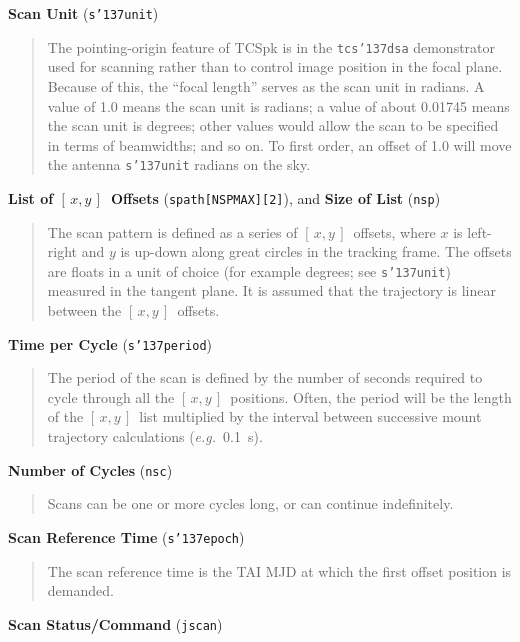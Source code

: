\documentclass[12pt,fleqn,twoside]{article}
\renewcommand{\_}{{\tt\char'137}}     %
\newcommand{\xy}        {$[\,x,y\,]$}
\begin{document}
{\bf Scan Unit} ({\tt s\_unit})
\begin{quote}
     The pointing-origin feature of TCSpk is in the
     {\tt tcs\_dsa} demonstrator used for scanning rather than
     to control image position in the focal plane.  Because of
     this, the ``focal length'' serves as the scan unit in radians.
     A value of 1.0 means the scan unit is
     radians;  a value of about 0.01745 means the scan unit is
     degrees;  other values would allow the scan to be specified
     in terms of beamwidths; and so on.  To first order, an offset
     of 1.0 will move the antenna {\tt s\_unit} radians on the sky.
\end{quote}
     {\bf List of \xy\ Offsets} ({\tt spath[NSPMAX][2]}), and
     {\bf Size of List} ({\tt nsp})
\begin{quote}
     The scan pattern is defined as a series of \xy\ offsets,
     where $x$ is left-right and $y$ is up-down along great circles
     in the tracking frame.  The offsets are floats in a unit of
     choice (for example degrees; see {\tt s\_unit}) measured
     in the tangent plane.
     It is assumed that the trajectory is linear between the
     \xy\ offsets.
\end{quote}
{\bf Time per Cycle} ({\tt s\_period})
\begin{quote}
     The period of the scan is defined by the number of
     seconds required to cycle through all the \xy\ positions.
     Often, the period will be the length of the \xy\ list
     multiplied by the interval between successive mount
     trajectory calculations ({\it e.g.}~0.1~s).
\end{quote}
{\bf Number of Cycles} ({\tt nsc})
\begin{quote}
     Scans can be one or more cycles long, or can continue
     indefinitely.
\end{quote}
{\bf Scan Reference Time} ({\tt s\_epoch})
\begin{quote}
     The scan reference time is the TAI MJD at which
     the first offset position is demanded.
\end{quote}
{\bf Scan Status/Command} ({\tt jscan})
\end{document}
